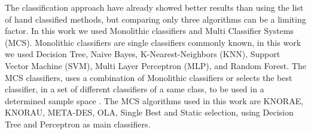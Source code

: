 The classification approach have already showed better results than using the list of hand classified methods, but comparing only three algorithms can be a limiting factor. In this work we used Monolithic classifiers and Multi Classifier Systems (MCS). Monolithic classifiers are single classifiers commonly known, in this work we used Decision Tree, Naive Bayes, K-Nearest-Neighbors (KNN), Support Vector Machine (SVM), Multi Layer Perceptron (MLP), and Random Forest. The MCS classifiers, uses a combination of Monolithic classifiers or selects the best classifier, in a set of different classifiers of a same class, to be used in a determined sample space \citep{cruz2018dynamic}. The MCS algorithms used in this work are KNORAE, KNORAU, META-DES, OLA, Single Best and Static selection, using Decision Tree and Perceptron as main classifiers.